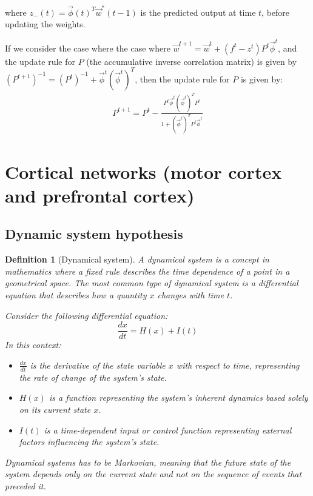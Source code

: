 \documentclass[11pt]{book} %
\newtheorem{definition}{Definition}[section]
\begin{document}
where $z_{-} (t) = \vec{\phi}(t)^T \vec{w}^*(t-1)$ is the predicted output at time $t$, before updating the weights.

If we consider the case where the case where $\vec{w}^{t+1} = \vec{w}^t + (f^t - z^t) P^t \vec{\phi}^t $, 
and the update rule for $P$ (the accumulative inverse correlation matrix) is given by $(P^{t+1})^{-1} = (P^t)^{-1}  + \vec{\phi}^t (\vec{\phi}^{t})^T$,
then the update rule for $P$ is given by:
\begin{align*}
    P^{t+1} = P^t - \frac{P^t \vec{\phi}^t (\vec{\phi}^t)^T P^t}{1 + (\vec{\phi}^t)^T P^t \vec{\phi}^t}
\end{align*}

%
%
%

\section{Cortical networks (motor cortex and prefrontal cortex)}

\subsection{Dynamic system hypothesis}
\begin{definition}[Dynamical system]
    A dynamical system is a concept in mathematics where a fixed rule describes the time dependence of a point in a geometrical space. 
    The most common type of dynamical system is a differential equation that describes how a quantity \( x \) changes with time \( t \). 

    Consider the following differential equation:
    \begin{equation}
        \frac{dx}{dt} = H(x) + I(t)
    \end{equation}
    In this context:
    \begin{itemize}
        \item \( \frac{dx}{dt} \) is the derivative of the state variable \( x \) with respect to time, representing the rate of change of the system's state.
        \item \( H(x) \) is a function representing the system's inherent dynamics based solely on its current state \( x \).
        \item \( I(t) \) is a time-dependent input or control function representing external factors influencing the system's state.
    \end{itemize}  
    Dynamical systems has to be Markovian, meaning that the future state of the system depends only on the current state and not on the sequence of events that preceded it.  
\end{definition}
\end{document}
